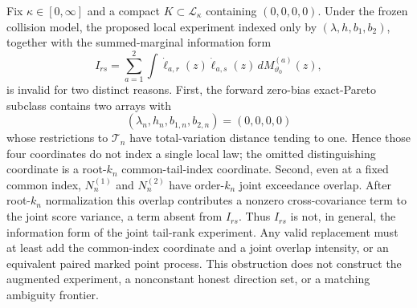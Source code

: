 Fix \(\kappa\in[0,\infty]\) and a compact \(K\subset\mathcal L_\kappa\) containing \((0,0,0,0)\).  Under the frozen collision model, the proposed local experiment indexed only by \((\lambda,h,b_1,b_2)\), together with the summed-marginal information form
\[
 I_{rs}=\sum_{a=1}^2\int\dot\ell_{a,r}(z)\dot\ell_{a,s}(z)\,dM_{\vartheta_0}^{(a)}(z),
\]
is invalid for two distinct reasons.  First, the forward zero-bias exact-Pareto subclass contains two arrays with
\[
 (\lambda_n,h_n,b_{1,n},b_{2,n})=(0,0,0,0)
\]
whose restrictions to \(\mathcal T_n\) have total-variation distance tending to one.  Hence those four coordinates do not index a single local law; the omitted distinguishing coordinate is a root-\(k_n\) common-tail-index coordinate.  Second, even at a fixed common index, \(N_n^{(1)}\) and \(N_n^{(2)}\) have order-\(k_n\) joint exceedance overlap.  After root-\(k_n\) normalization this overlap contributes a nonzero cross-covariance term to the joint score variance, a term absent from \(I_{rs}\).  Thus \(I_{rs}\) is not, in general, the information form of the joint tail-rank experiment.  Any valid replacement must at least add the common-index coordinate and a joint overlap intensity, or an equivalent paired marked point process.  This obstruction does not construct the augmented experiment, a nonconstant honest direction set, or a matching ambiguity frontier.